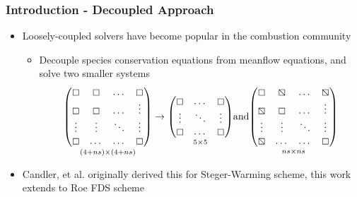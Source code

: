 \documentclass{beamer}
\begin{document}
\begin{frame}
  \frametitle{Introduction - Decoupled Approach}
  \begin{itemize}
    \item Loosely-coupled solvers have become popular in the combustion
      community
      \begin{itemize}
        \item Decouple species conservation equations from meanflow equations,
          and solve two smaller systems
         \[
           \underset{(4+ns) \times (4+ns)}
           {\begin{pmatrix}
             \boxempty & \boxempty & \dots  & \boxempty \\
             \boxempty & \boxempty & \dots  & \vdots \\
             \vdots    & \vdots    & \ddots & \vdots \\
             \boxempty & \dots     & \dots  & \boxempty
           \end{pmatrix}}
           \to
           \underset{5 \times 5}
           {\begin{pmatrix}
             \boxempty & \dots  & \boxempty \\
             \vdots    & \ddots & \vdots \\
             \boxempty & \dots  & \boxempty
           \end{pmatrix}}
           \text{and}
           \underset{ns \times ns}
           {\begin{pmatrix}
             \boxempty  & \boxbslash & \dots  & \boxbslash \\
             \boxbslash & \boxempty  & \dots  & \vdots \\
             \vdots     & \vdots     & \ddots & \vdots \\
             \boxbslash & \dots      & \dots  & \boxempty
           \end{pmatrix}}
         \]
    \end{itemize}
  \item Candler, et al. originally derived this for
    Steger-Warming scheme, this work extends to Roe FDS scheme
  \end{itemize}
\end{frame}

\end{document}
